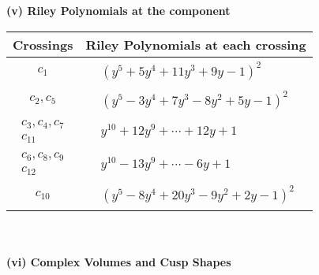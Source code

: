 \documentclass[1p]{elsarticle_modified}
\theoremstyle{definition}
\begin{document}
\newpage\renewcommand{\arraystretch}{1}
\flushleft \textbf{(v) Riley Polynomials at the component}\newline \\
\begin{tabular}{m{50pt}|m{274pt}}
Crossings & \hspace{64pt}Riley Polynomials at each crossing \\
\hline $$\begin{aligned}c_{1}\end{aligned}$$&$\begin{aligned}
&(y^5+5 y^4+11 y^3+9 y-1)^2
\end{aligned}$\\
\hline $$\begin{aligned}c_{2},c_{5}\end{aligned}$$&$\begin{aligned}
&(y^5-3 y^4+7 y^3-8 y^2+5 y-1)^2
\end{aligned}$\\
\hline $$\begin{aligned}c_{3},c_{4},c_{7}\\c_{11}\end{aligned}$$&$\begin{aligned}
&y^{10}+12 y^9+\cdots+12 y+1
\end{aligned}$\\
\hline $$\begin{aligned}c_{6},c_{8},c_{9}\\c_{12}\end{aligned}$$&$\begin{aligned}
&y^{10}-13 y^9+\cdots-6 y+1
\end{aligned}$\\
\hline $$\begin{aligned}c_{10}\end{aligned}$$&$\begin{aligned}
&(y^5-8 y^4+20 y^3-9 y^2+2 y-1)^2
\end{aligned}$\\
\hline
\end{tabular}\\~\\
\newpage\flushleft \textbf{(vi) Complex Volumes and Cusp Shapes}
\end{document}
